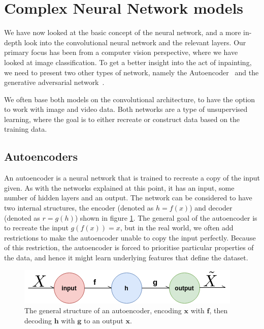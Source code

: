 \section{Complex Neural Network models}
We have now looked at the basic concept of the neural network, and a more in-depth look into the convolutional neural network and the relevant layers.
Our primary focus has been from a computer vision perspective, where we have looked at image classification. 
To get a better insight into the act of inpainting, we need to present two other types of network, namely the Autoencoder~\cite{Rumelhart:1986:LIR:104279.104293} and the generative adversarial network~\cite{Goodfellow:2014:GAN:2969033.2969125}.

We often base both models on the convolutional architecture, to have the option to work with image and video data. 
Both networks are a type of unsupervised learning, where the goal is to either recreate or construct data based on the training data.



\subsection{Autoencoders}
\label{cha:Explaining_autoencoders}
An autoencoder is a neural network that is trained to recreate a copy of the input given. 
As with the networks explained at this point, it has an input, some number of hidden layers and an output. The network can be considered to have two internal structures, the encoder (denoted as $h=f(x)$) and decoder (denoted as $r=g(h)$) shown in figure \ref{fig:simpleAE}.
The general goal of the autoencoder is to recreate the input $g(f(x)) = x$, but in the real world, we often add restrictions to make the autoencoder unable to copy the input perfectly. Because of this restriction, the autoencoder is forced to prioritise particular properties of the data, and hence it might learn underlying features that define the dataset.

\begin{figure}
    \centering
    \includegraphics[scale=0.8]{background/figures/SimpleAE.png}
    \caption{The general structure of an autoencoder, encoding $\textbf{x}$ with $\textbf{f}$, then decoding $\textbf{h}$ with $\textbf{g}$ to an output $\textbf{x}$.}
    \label{fig:simpleAE}
\end{figure}

